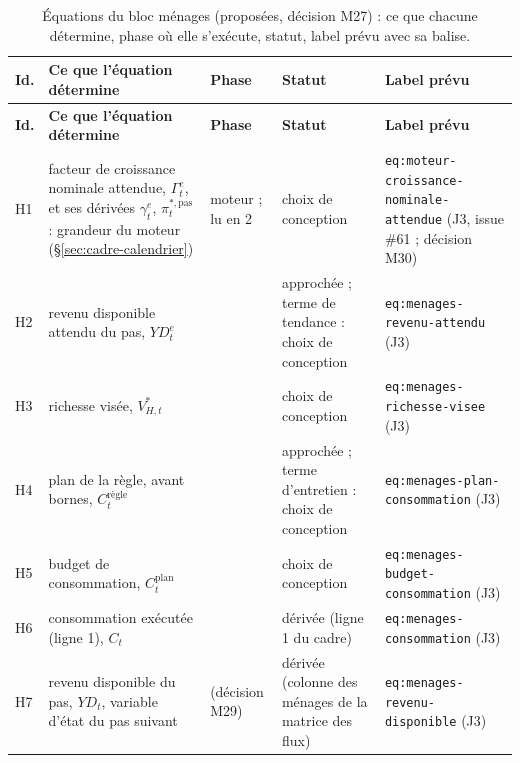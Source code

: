 \documentclass[11pt,a4paper]{article}
\begin{document}
\begin{center}\footnotesize
\setlength{\tabcolsep}{4pt}
\begin{longtable}{>{\raggedright\arraybackslash}p{0.8cm}>{\raggedright\arraybackslash}p{4.6cm}>{\raggedright\arraybackslash}p{1.4cm}>{\raggedright\arraybackslash}p{3.4cm}>{\raggedright\arraybackslash}p{4.5cm}}
\caption{Équations du bloc ménages (proposées, décision M27) : ce que chacune détermine, phase où elle s'exécute, statut, label prévu avec sa balise.}\label{tab:menages-equations}\\
\toprule
\textbf{Id.} & \textbf{Ce que l'équation détermine} & \textbf{Phase} & \textbf{Statut} & \textbf{Label prévu}\\
\midrule
\endfirsthead
\toprule
\textbf{Id.} & \textbf{Ce que l'équation détermine} & \textbf{Phase} & \textbf{Statut} & \textbf{Label prévu}\\
\midrule
\endhead
H1 & facteur de croissance nominale attendue, $\Gamma^e_t$, et ses dérivées $\gamma^e_t$, $\pi^{\ast,\mathrm{pas}}_t$ : grandeur du moteur (\S\ref{sec:cadre-calendrier}) & moteur ; lu en 2 & choix de conception & \texttt{eq:moteur-\allowbreak croissance-\allowbreak nominale-\allowbreak attendue} (J3, issue \#61 ; décision M30)\\
H2 & revenu disponible attendu du pas, $\mathit{YD}^e_t$ & 2 & approchée ; terme de tendance : choix de conception & \texttt{eq:menages-\allowbreak revenu-attendu} (J3)\\
H3 & richesse visée, $V^\ast_{H,t}$ & 2 & choix de conception & \texttt{eq:menages-\allowbreak richesse-visee} (J3)\\
H4 & plan de la règle, avant bornes, $C^{\text{règle}}_t$ & 2 & approchée ; terme d'entretien : choix de conception & \texttt{eq:menages-\allowbreak plan-consommation} (J3)\\
H5 & budget de consommation, $C^{\mathrm{plan}}_t$ & 2 & choix de conception & \texttt{eq:menages-\allowbreak budget-consommation} (J3)\\
H6 & consommation exécutée (ligne 1), $C_t$ & 5 & dérivée (ligne 1 du cadre) & \texttt{eq:menages-\allowbreak consommation} (J3)\\
H7 & revenu disponible du pas, $\mathit{YD}_t$, variable d'état du pas suivant & 9 (décision M29) & dérivée (colonne des ménages de la matrice des flux) & \texttt{eq:menages-\allowbreak revenu-disponible} (J3)\\
\bottomrule
\end{longtable}
\end{center}
\end{document}
